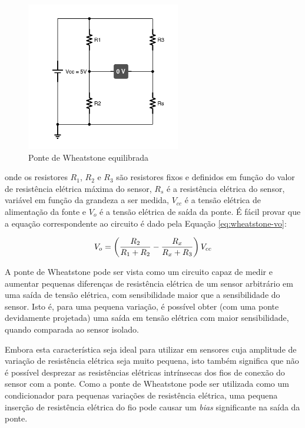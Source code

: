 \documentclass[a4paper]{instrumentacao}
\begin{document}
\begin{figure}[H]
\centering
\includegraphics[width=0.6\textwidth]{Wheatstone-Bridge.pdf}
\caption{Ponte de Wheatstone equilibrada}
\label{fig:3fios-wheatstone}
\end{figure}

\noindent onde os resistores $R_1$, $R_2$ e $R_3$ são resistores fixos e definidos em função do valor de resistência elétrica máxima do sensor, $R_s$ é a resistência elétrica do sensor, variável em função da grandeza a ser medida, $V_{cc}$ é a tensão elétrica de alimentação da fonte e $V_o$ é a tensão elétrica de saída da ponte. É fácil provar que a equação correspondente ao circuito é dado pela Equação \ref{eq:wheatstone-vo}:

\begin{equation}
	V_o = \left({{R_2}\over{R_1 + R_2}} - {{R_x}\over{R_x + R_3}}\right)V_{cc}
	\label{eq:wheatstone-vo}
\end{equation}

A ponte de Wheatstone pode ser vista como um circuito capaz de medir e aumentar pequenas diferenças de resistência elétrica de um sensor arbitrário em uma saída de tensão elétrica, com sensibilidade maior que a sensibilidade do sensor. Isto é, para uma pequena variação, é possível obter (com uma ponte devidamente projetada) uma saída em tensão elétrica com maior sensibilidade, quando comparada ao sensor isolado.

Embora esta característica seja ideal para utilizar em sensores cuja amplitude de variação de resistência elétrica seja muito pequena, isto também significa que não é possível desprezar as resistências elétricas intrínsecas dos fios de conexão do sensor com a ponte. Como a ponte de Wheatstone pode ser utilizada como um condicionador para pequenas variações de resistência elétrica, uma pequena inserção de resistência elétrica do fio pode causar um \textit{bias} significante na saída da ponte.
\end{document}

